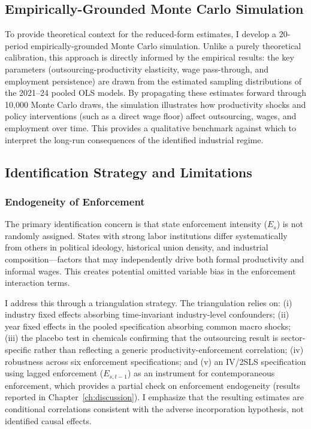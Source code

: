 \subsection{Empirically-Grounded Monte Carlo Simulation}

To provide theoretical context for the reduced-form estimates, I develop a 20-period empirically-grounded Monte Carlo simulation. Unlike a purely theoretical calibration, this approach is directly informed by the empirical results: the key parameters (outsourcing-productivity elasticity, wage pass-through, and employment persistence) are drawn from the estimated sampling distributions of the 2021--24 pooled OLS models. By propagating these estimates forward through 10,000 Monte Carlo draws, the simulation illustrates how productivity shocks and policy interventions (such as a direct wage floor) affect outsourcing, wages, and employment over time. This provides a qualitative benchmark against which to interpret the long-run consequences of the identified industrial regime.

\subsection{Identification Strategy and Limitations}

\subsubsection{Endogeneity of Enforcement}

The primary identification concern is that state enforcement intensity ($E_s$) is not randomly assigned. States with strong labor institutions differ systematically from others in political ideology, historical union density, and industrial composition—factors that may independently drive both formal productivity and informal wages. This creates potential omitted variable bias in the enforcement interaction terms.

I address this through a triangulation strategy. The triangulation relies on: (i) industry fixed effects absorbing time-invariant industry-level confounders; (ii) year fixed effects in the pooled specification absorbing common macro shocks; (iii) the placebo test in chemicals confirming that the outsourcing result is sector-specific rather than reflecting a generic productivity-enforcement correlation; (iv) robustness across six enforcement specifications; and (v) an IV/2SLS specification using lagged enforcement ($E_{s,t-1}$) as an instrument for contemporaneous enforcement, which provides a partial check on enforcement endogeneity (results reported in Chapter~\ref{ch:discussion}). I emphasize that the resulting estimates are conditional correlations consistent with the adverse incorporation hypothesis, not identified causal effects.

